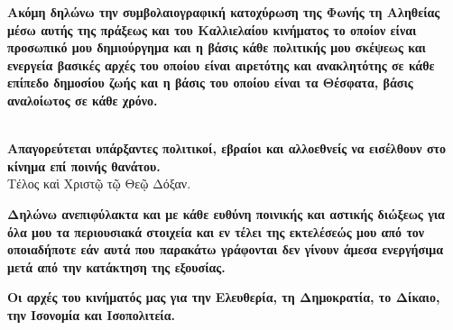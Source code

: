 \documentclass[a4paper]{article}
\begin{document}
\textbf{Ακόμη δηλώνω την συμβολαιογραφική κατοχύρωση της Φωνής τη Αληθείας μέσω αυτής της πράξεως και του Καλλιελαίου κινήματος το οποίον είναι προσωπικό μου δημιούργημα και η βάσις κάθε πολιτικής μου σκέψεως και ενεργεία βασικές αρχές του οποίου είναι αιρετότης και ανακλητότης σε κάθε επίπεδο δημοσίου ζωής και η βάσις του οποίου είναι τα Θέσφατα, βάσις αναλοίωτος σε κάθε χρόνο.}

\\

\textbf{Απαγορεύτεται υπάρξαντες πολιτικοί, εβραίοι και αλλοεθνείς να εισέλθουν στο κίνημα επί ποινής θανάτου.}\\
Τέλος καὶ Χριστῷ τῷ Θεῷ Δόξαν.

%

%

\textbf{Δηλώνω ανεπιφύλακτα και με κάθε ευθύνη ποινικής και αστικής διώξεως για όλα μου τα περιουσιακά στοιχεία και εν τέλει της εκτελέσεώς μου από τον οποιαδήποτε εάν αυτά που παρακάτω γράφονται δεν γίνουν άμεσα ενεργήσιμα μετά από την κατάκτηση της εξουσίας.}

\textbf{Οι αρχές του κινήματός μας για την Ελευθερία, τη Δημοκρατία, το Δίκαιο, την Ισονομία και Ισοπολιτεία.}
\end{document}
